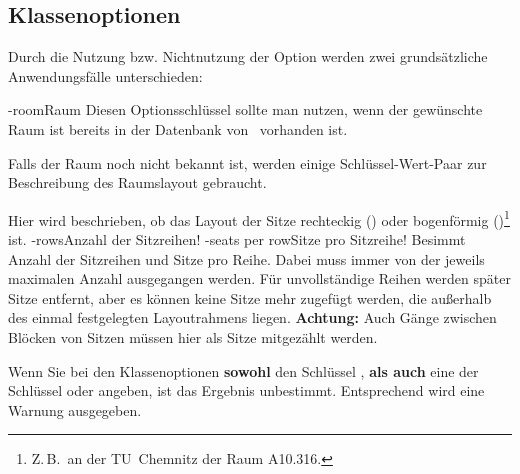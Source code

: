 \documentclass[
babel-options={ngerman},
load-preamble-,
scrartcl={headings=small}
]{cnltx-doc}
\providecommand{\packagename}{tucseating}
\def\thepkg{\pkg*{\packagename}}
\begin{document}
\subsection{Klassenoptionen}
\label{sec:class-options}
Durch die Nutzung bzw. Nichtnutzung der Option  werden zwei
grundsätzliche Anwendungsfälle unterschieden:
\begin{options}
  \keyval-{room}{Raum} Diesen Optionsschlüssel sollte man nutzen, wenn der gewünschte
  Raum ist bereits in der Datenbank von \thepkg\ vorhanden ist. 
\end{options}
Falls der Raum noch nicht bekannt ist, werden einige Schlüssel-Wert-Paar zur
Beschreibung des Raumslayout gebraucht.
\begin{options}
  Hier wird beschrieben, ob das Layout der Sitze rechteckig
  () oder bogenförmig ()\footnote{Z.\,B.\ an der
    TU~Chemnitz der Raum A10.316.} ist.
  \keyval-{rows}{Anzahl der Sitzreihen}\Default*!{}\vspace{-.3\baselineskip}
  \keyval-{seats per row}{Sitze pro Sitzreihe}\Default!{}
  Besimmt Anzahl der Sitzreihen und Sitze pro Reihe. Dabei muss immer von der
  jeweils maximalen Anzahl ausgegangen werden. Für unvollständige Reihen werden später Sitze
  entfernt, aber es können keine Sitze mehr zugefügt werden, die außerhalb des einmal
  festgelegten Layoutrahmens liegen. \textbf{Achtung:} Auch Gänge zwischen
  Blöcken von Sitzen müssen hier als Sitze mitgezählt werden.
\end{options}
Wenn Sie bei den Klassenoptionen \textbf{sowohl} den Schlüssel , \textbf{als auch}
eine der Schlüssel  oder  angeben, ist das Ergebnis
unbestimmt. Entsprechend wird eine Warnung ausgegeben.\medskip
\end{document}
